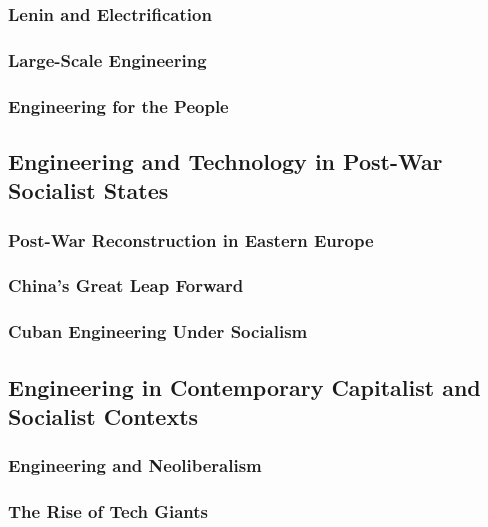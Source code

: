 \subsubsection{Lenin and Electrification}

\subsubsection{Large-Scale Engineering}

\subsubsection{Engineering for the People}

\newpage

\subsection{Engineering and Technology in Post-War Socialist States}

\subsubsection{Post-War Reconstruction in Eastern Europe}

\subsubsection{China's Great Leap Forward}

\subsubsection{Cuban Engineering Under Socialism}

\newpage

\subsection{Engineering in Contemporary Capitalist and Socialist Contexts}

\subsubsection{Engineering and Neoliberalism}

\subsubsection{The Rise of Tech Giants}

